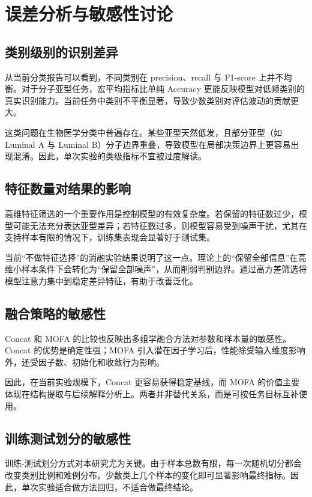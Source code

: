 \section{误差分析与敏感性讨论}

\subsection{类别级别的识别差异}

从当前分类报告可以看到，不同类别在 precision、recall 与 F1-score 上并不均衡。对于分子亚型任务，宏平均指标比单纯 Accuracy 更能反映模型对低频类别的真实识别能力。当前任务中类别不平衡显著，导致少数类别对评估波动的贡献更大。

这类问题在生物医学分类中普遍存在。某些亚型天然低发，且部分亚型（如 Luminal A 与 Luminal B）分子边界重叠，导致模型在局部决策边界上更容易出现混淆。因此，单次实验的类级指标不宜被过度解读。

\subsection{特征数量对结果的影响}

高维特征筛选的一个重要作用是控制模型的有效复杂度。若保留的特征数过少，模型可能无法充分表达亚型差异；若特征数过多，则模型容易受到噪声干扰，尤其在支持样本有限的情况下，训练集表现会显著好于测试集。

当前“不做特征选择”的消融实验结果说明了这一点。理论上的“保留全部信息”在高维小样本条件下会转化为“保留全部噪声”，从而削弱判别边界。通过高方差筛选将模型注意力集中到稳定差异特征，有助于改善泛化。

\subsection{融合策略的敏感性}

Concat 和 MOFA 的比较也反映出多组学融合方法对参数和样本量的敏感性。Concat 的优势是确定性强；MOFA 引入潜在因子学习后，性能除受输入维度影响外，还受因子数、初始化和收敛行为影响。

因此，在当前实验规模下，Concat 更容易获得稳定基线，而 MOFA 的价值主要体现在结构提取与后续解释分析上。两者并非替代关系，而是可按任务目标互补使用。

\subsection{训练测试划分的敏感性}

训练-测试划分方式对本研究尤为关键。由于样本总数有限，每一次随机切分都会改变类别比例和难例分布。少数类上几个样本的变化即可显著影响最终指标。因此，单次实验适合做方法回归，不适合做最终结论。

